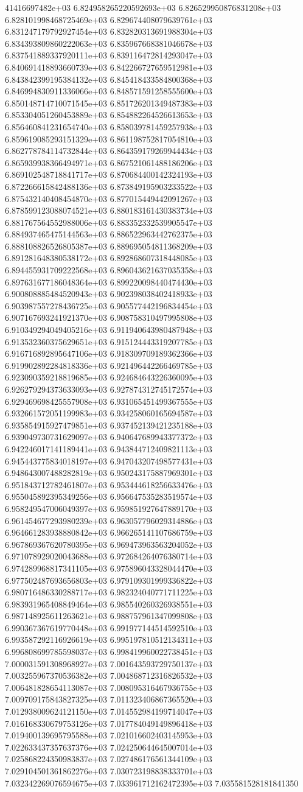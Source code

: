 41416697482e+03	6.824958265220592693e+03	6.826529950876831208e+03	6.828101998468725469e+03	6.829674408079639761e+03	6.831247179792927454e+03	6.832820313691988304e+03	6.834393809860222063e+03	6.835967668381046678e+03	6.837541889337920111e+03	6.839116472814293047e+03	6.840691418893660739e+03	6.842266727659512981e+03	6.843842399195384132e+03	6.845418433584800368e+03	6.846994830911336066e+03	6.848571591258555600e+03	6.850148714710071545e+03	6.851726201349487383e+03	6.853304051260453889e+03	6.854882264526613653e+03	6.856460841231654740e+03	6.858039781459257938e+03	6.859619085293151329e+03	6.861198752817054810e+03	6.862778784114732844e+03	6.864359179269944434e+03	6.865939938366494971e+03	6.867521061488186206e+03	6.869102548718841717e+03	6.870684400142324193e+03	6.872266615842488136e+03	6.873849195903233522e+03	6.875432140408454870e+03	6.877015449442091267e+03	6.878599123088074521e+03	6.880183161430383734e+03	6.881767564552988006e+03	6.883352332539905547e+03	6.884937465475144563e+03	6.886522963442762375e+03	6.888108826526805387e+03	6.889695054811368209e+03	6.891281648380538172e+03	6.892868607318448085e+03	6.894455931709222568e+03	6.896043621637035358e+03	6.897631677186048364e+03	6.899220098440474430e+03	6.900808885484520943e+03	6.902398038402418933e+03	6.903987557278436725e+03	6.905577442196834454e+03	6.907167693241921370e+03	6.908758310497995808e+03	6.910349294049405216e+03	6.911940643980487948e+03	6.913532360375629651e+03	6.915124443319207785e+03	6.916716892895647106e+03	6.918309709189362366e+03	6.919902892284818336e+03	6.921496442266469785e+03	6.923090359218819685e+03	6.924684643226360095e+03	6.926279294373633093e+03	6.927874312745172574e+03	6.929469698425557908e+03	6.931065451499367555e+03	6.932661572051199983e+03	6.934258060165694587e+03	6.935854915927479851e+03	6.937452139421235188e+03	6.939049730731629097e+03	6.940647689943377372e+03	6.942246017141189441e+03	6.943844712409821113e+03	6.945443775834018197e+03	6.947043207498577431e+03	6.948643007488282819e+03	6.950243175887969301e+03	6.951843712782461807e+03	6.953444618256633476e+03	6.955045892395349256e+03	6.956647535283519574e+03	6.958249547006049397e+03	6.959851927647889170e+03	6.961454677293980239e+03	6.963057796029314886e+03	6.964661283938880842e+03	6.966265141107686759e+03	6.967869367620780395e+03	6.969473963563204052e+03	6.971078929020043688e+03	6.972684264076380714e+03	6.974289968817341105e+03	6.975896043328044470e+03	6.977502487693656803e+03	6.979109301999336822e+03	6.980716486330288717e+03	6.982324040771711225e+03	6.983931965408849464e+03	6.985540260326938551e+03	6.987148925611263621e+03	6.988757961347099808e+03	6.990367367619770448e+03	6.991977144514592510e+03	6.993587292116926619e+03	6.995197810512134311e+03	6.996808699785598037e+03	6.998419960022738451e+03	7.000031591308968927e+03	7.001643593729750137e+03	7.003255967370536382e+03	7.004868712316826532e+03	7.006481828654113087e+03	7.008095316467936755e+03	7.009709175843827325e+03	7.011323406867365520e+03	7.012938009624121150e+03	7.014552984199714047e+03	7.016168330679753126e+03	7.017784049149896418e+03	7.019400139695795588e+03	7.021016602403145953e+03	7.022633437357637376e+03	7.024250644645007014e+03	7.025868224350983837e+03	7.027486176561344109e+03	7.029104501361862276e+03	7.030723198838333701e+03	7.032342269076594675e+03	7.033961712162472395e+03	7.035581528181841350